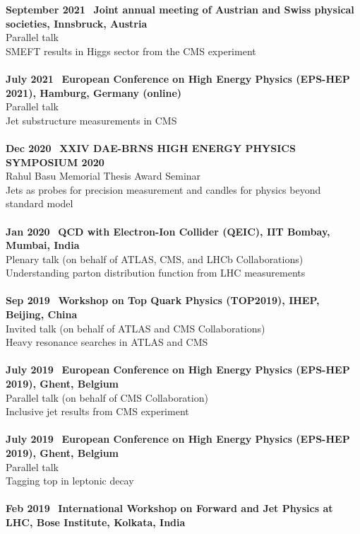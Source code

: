 \documentclass[a4paper,11pt]{article}
\begin{document}
\textbf{September 2021} \ \textbf{Joint annual meeting of Austrian and Swiss physical societies, Innsbruck, Austria} \\
Parallel talk \\
SMEFT results in Higgs sector from the CMS experiment\\
\\
\textbf{July 2021} \ \textbf{European Conference on High Energy Physics (EPS-HEP 2021), Hamburg, Germany (online)} \\
Parallel talk \\
Jet substructure measurements in CMS\\
\\
\textbf{Dec 2020} \ \textbf{XXIV DAE-BRNS HIGH ENERGY PHYSICS SYMPOSIUM 2020} \\
Rahul Basu Memorial Thesis Award Seminar \\
Jets as probes for precision measurement and candles for physics beyond standard model\\
\\
\textbf{Jan 2020} \ \textbf{QCD with Electron-Ion Collider (QEIC), IIT Bombay, Mumbai, India} \\
Plenary talk (on behalf of ATLAS, CMS, and LHCb Collaborations) \\
Understanding parton distribution function from LHC measurements\\
\\
\textbf{Sep 2019} \ \textbf{Workshop on Top Quark Physics (TOP2019), IHEP, Beijing, China} \\
Invited talk (on behalf of ATLAS and CMS Collaborations) \\
Heavy resonance searches in ATLAS and CMS \\
\\
\textbf{July 2019} \ \textbf{European Conference on High Energy Physics (EPS-HEP 2019), Ghent, Belgium} \\
Parallel talk (on behalf of CMS Collaboration) \\
Inclusive jet results from CMS experiment  \\
\\
\textbf{July 2019} \ \textbf{European Conference on High Energy Physics (EPS-HEP 2019), Ghent, Belgium} \\
Parallel talk \\
Tagging top in leptonic decay \\
\\
\textbf{Feb 2019} \ \textbf{International Workshop on Forward and Jet Physics at LHC, Bose Institute, Kolkata, India} \\
\end{document}
